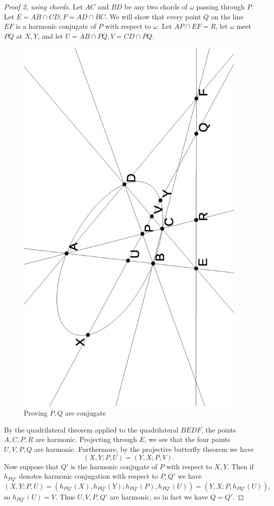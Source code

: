 \documentclass[letterpaper,11pt]{article}
\theoremstyle{definition}
\theoremstyle{remark}
\begin{document}
\begin{proof}[Proof 2, using chords]
Let $AC$ and $BD$ be any two chords of $\omega$ passing through $P$. Let $E = AB\cap CD, F = AD\cap BC$. We will show that every point $Q$ on the line $EF$ is a harmonic conjugate of $P$ with respect to $\omega$. Let $AP\cap EF = R$, let $\omega$ meet $PQ$ at $X,Y$, and let $U = AB\cap PQ, V = CD\cap PQ$.

\begin{figure}[!htb]
\centering
\includegraphics[scale=0.5,angle=270]{polar.eps}
\caption{Proving $P,Q$ are conjugate}
\end{figure}

By the quadrilateral theorem applied to the quadrilateral $BEDF$, the points $A,C,P,R$ are harmonic. Projecting through $E$, we see that the four points $U,V,P,Q$ are harmonic. Furthermore, by the projective butterfly theorem we have
\[
(X,Y;P,U) = (Y,X;P,V).
\]
Now suppose that $Q'$ is the harmonic conjugate of $P$ with respect to $X,Y$. Then if $h_{PQ'}$ denotes harmonic conjugation with respect to $P,Q'$ we have
\[
(X,Y;P,U) = (h_{PQ'}(X),h_{PQ'}(Y);h_{PQ'}(P),h_{PQ'}(U)) = (Y,X;P,h_{PQ'}(U)),
\]
so $h_{PQ'}(U) = V$. Thus $U,V,P,Q'$ are harmonic, so in fact we have $Q=Q'$.
\end{proof}
\end{document}
